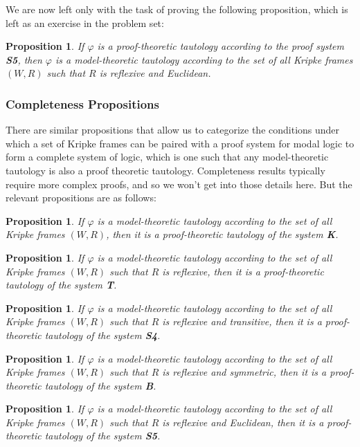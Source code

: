 \documentclass[11pt]{article}
\newtheorem{proposition}[theorem]{Proposition}
\theoremstyle{definition}
\theoremstyle{remark}
\begin{document}
We are now left only with the task of proving the following proposition, which is left as an exercise in the problem set:
\begin{proposition}
    If $\varphi$ is a proof-theoretic tautology according to the proof system \textbf{S5}, then $\varphi$ is a model-theoretic tautology according to the set of all Kripke frames $(W,R)$ such that $R$ is reflexive and Euclidean.
\end{proposition}


\subsubsection{Completeness Propositions}
There are similar propositions that allow us to categorize the conditions under which a set of Kripke frames can be paired with a proof system for modal logic to form a complete system of logic, which is one such that any model-theoretic tautology is also a proof theoretic tautology. Completeness results typically require more complex proofs, and so we won't get into those details here. But the relevant propositions are as follows:
\begin{proposition}
    If $\varphi$ is a model-theoretic tautology according to the set of all Kripke frames $(W,R)$, then it is a proof-theoretic tautology of the system \textbf{K}. 
\end{proposition}
\begin{proposition}
    If $\varphi$ is a model-theoretic tautology according to the set of all Kripke frames $(W,R)$ such that $R$ is reflexive, then it is a proof-theoretic tautology of the system \textbf{T}. 
\end{proposition}
\begin{proposition}
    If $\varphi$ is a model-theoretic tautology according to the set of all Kripke frames $(W,R)$ such that $R$ is reflexive and transitive, then it is a proof-theoretic tautology of the system \textbf{S4}. 
\end{proposition}
\begin{proposition}
    If $\varphi$ is a model-theoretic tautology according to the set of all Kripke frames $(W,R)$ such that $R$ is reflexive and symmetric, then it is a proof-theoretic tautology of the system \textbf{B}. 
\end{proposition}
\begin{proposition}
    If $\varphi$ is a model-theoretic tautology according to the set of all Kripke frames $(W,R)$ such that $R$ is reflexive and Euclidean, then it is a proof-theoretic tautology of the system \textbf{S5}. 
\end{proposition}
\end{document}
